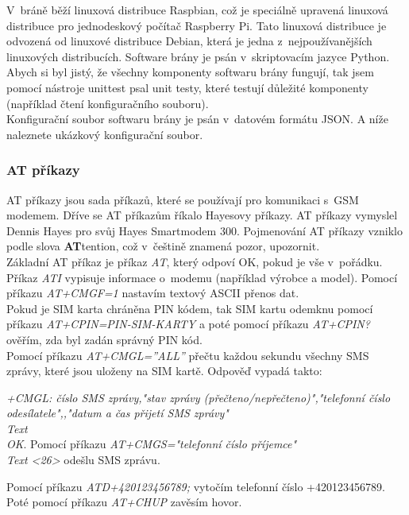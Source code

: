 \documentclass[12pt,a4paper,oneside]{article}
\begin{document}
V~bráně běží linuxová distribuce Raspbian, což je speciálně upravená linuxová distribuce pro jednodeskový počítač Raspberry Pi. Tato linuxová distribuce je odvozená od linuxové distribuce Debian, která je jedna z~nejpoužívanějších linuxových distribucích. Software brány je psán v~skriptovacím jazyce Python. Abych si byl jistý, že všechny komponenty softwaru brány fungují, tak jsem pomocí nástroje unittest psal unit testy, které testují důležité komponenty (například čtení konfiguračního souboru). \\

Konfigurační soubor softwaru brány je psán v~datovém formátu JSON. A níže naleznete ukázkový konfigurační soubor.

\subsubsection{AT příkazy}

AT příkazy jsou sada příkazů, které se používají pro komunikaci s~GSM modemem. Dříve se AT příkazům říkalo Hayesovy příkazy. AT příkazy vymyslel Dennis Hayes pro svůj Hayes Smartmodem 300. Pojmenování AT příkazy vzniklo podle slova \textbf{AT}tention, což v~češtině znamená pozor, upozornit. \\

Základní AT příkaz je příkaz \textit{AT}, který odpoví OK, pokud je vše v~pořádku. Příkaz \textit{ATI} vypisuje informace o~modemu (například výrobce a model). Pomocí příkazu \textit{AT+CMGF=1} nastavím textový ASCII přenos dat. \\

Pokud je SIM karta chráněna PIN kódem, tak SIM kartu odemknu pomocí příkazu \textit{AT+CPIN=PIN-SIM-KARTY} a poté pomocí příkazu \textit{AT+CPIN?} ověřím, zda byl zadán správný PIN kód. \\

Pomocí příkazu \textit{AT+CMGL=”ALL”} přečtu každou sekundu všechny SMS zprávy, které jsou uloženy na SIM kartě. Odpověď vypadá takto:

\textit{+CMGL: číslo SMS zprávy,"stav zprávy (přečteno/nepřečteno)","telefonní číslo odesílatele",,"datum a čas přijetí SMS zprávy" \\ Text \\ OK}. 
Pomocí příkazu \textit{AT+CMGS="telefonní číslo příjemce" \\ Text <26>} odešlu SMS zprávu.

Pomocí příkazu \textit{ATD+420123456789;} vytočím telefonní číslo +420123456789. Poté pomocí příkazu \textit{AT+CHUP} zavěsím hovor.
\end{document}
